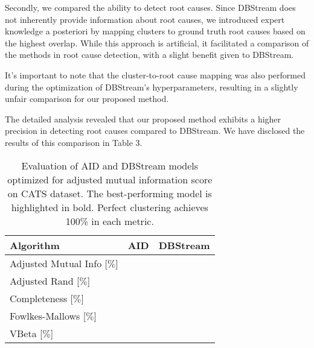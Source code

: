 \documentclass{article}
\begin{document}
\begin{enumerate}
        Secondly, we compared the ability to detect root causes. Since DBStream does not inherently provide information about root causes, we introduced expert knowledge a posteriori by mapping clusters to ground truth root causes based on the highest overlap. While this approach is artificial, it facilitated a comparison of the methods in root cause detection, with a slight benefit given to DBStream.

        It's important to note that the cluster-to-root cause mapping was also performed during the optimization of DBStream's hyperparameters, resulting in a slightly unfair comparison for our proposed method.
        
        The detailed analysis revealed that our proposed method exhibits a higher precision in detecting root causes compared to DBStream. We have disclosed the results of this comparison in Table 3.

        \begin{table}[htbp]
            \caption{Evaluation of AID and DBStream models optimized for adjusted mutual information score on CATS dataset. The best-performing model is highlighted in bold. Perfect clustering achieves 100\% in each metric.}
            \begin{center}
                \label{tab:perf_comp_cluster}
                \begin{tabular}{|l|c|c|}
                    \hline
                    \textbf{Algorithm}          & AID               & DBStream \\
                    \hline
                    Adjusted Mutual Info [$\%$] & $\boldsymbol{}$ &         \\
                    \hline
                    Adjusted Rand [$\%$]        & $\boldsymbol{}$ &         \\
                    \hline
                    Completeness [$\%$]         & $\boldsymbol{}$ &        \\
                    \hline
                    Fowlkes-Mallows [$\%$]      & $\boldsymbol{}$ &        \\
                    \hline
                    VBeta [$\%$]                & $\boldsymbol{}$ &        \\
                    \hline
                \end{tabular}
            \end{center}
        \end{table}


\end{enumerate}
\end{document}
